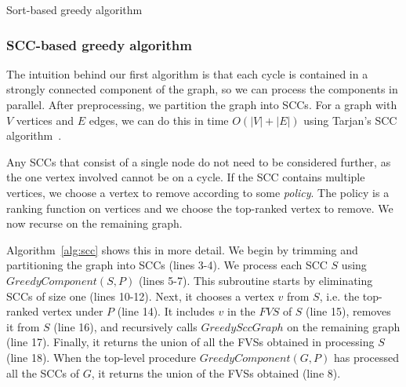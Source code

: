 \begin{algorithm}[t]
\SetAlgoLined\DontPrintSemicolon
{}
\caption{Sort-based greedy algorithm}
\label{alg:sort}
\end{algorithm}




\subsubsection{SCC-based greedy algorithm}

The intuition behind our first algorithm is that each cycle is contained in a strongly connected component of the graph, so we can process the components in parallel. After preprocessing, we partition the graph into SCCs. For a graph with $V$ vertices and $E$ edges, we can do this in time $O(|V|+|E|)$ using Tarjan's SCC algorithm~\cite{tarjan1972depth}.

Any SCCs that consist of a single node do not need to be considered further, as the one vertex involved cannot be on a cycle. If the SCC contains multiple vertices, we choose a vertex to remove according to some \emph{policy}. The policy is a ranking function on vertices and we choose the top-ranked vertex to remove. We now recurse on the remaining graph.




Algorithm~\ref{alg:scc} shows this in more detail. We begin by trimming and partitioning the graph into SCCs  (lines 3-4). We process each SCC $S$ using $GreedyComponent(S, P)$ (lines 5-7). This subroutine starts by eliminating SCCs of size one (lines 10-12). Next, it chooses a vertex $v$ from $S$, i.e. the top-ranked vertex under $P$ (line 14). It includes $v$ in the $FVS$ of $S$ (line 15), removes it from $S$ (line 16), and recursively calls $GreedySccGraph$ on the remaining graph (line 17). Finally, it returns the union of all the FVSs obtained in processing $S$ (line 18). When the top-level procedure $GreedyComponent(G, P)$ has processed all the SCCs of $G$, it returns the union of the FVSs obtained (line 8).

